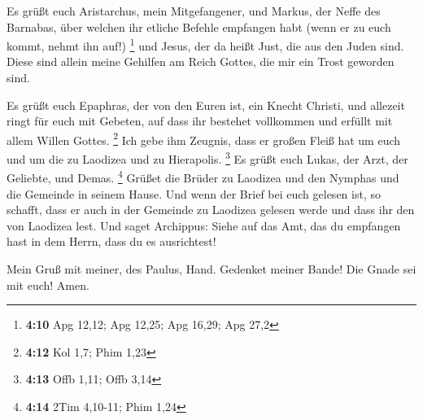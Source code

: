  Es grüßt euch Aristarchus, mein Mitgefangener, und Markus,
der Neffe des Barnabas, über welchen ihr etliche Befehle empfangen habt
(wenn er zu euch kommt, nehmt ihn auf!) \footnote{\textbf{4:10} Apg
  12,12; Apg 12,25; Apg 16,29; Apg 27,2}  und Jesus, der da
heißt Just, die aus den Juden sind. Diese sind allein meine Gehilfen am
Reich Gottes, die mir ein Trost geworden sind.

 Es grüßt euch Epaphras, der von den Euren ist, ein Knecht
Christi, und allezeit ringt für euch mit Gebeten, auf dass ihr bestehet
vollkommen und erfüllt mit allem Willen Gottes. \footnote{\textbf{4:12}
  Kol 1,7; Phim 1,23}  Ich gebe ihm Zeugnis, dass er großen
Fleiß hat um euch und um die zu Laodizea und zu Hierapolis. \footnote{\textbf{4:13}
  Offb 1,11; Offb 3,14}  Es grüßt euch Lukas, der Arzt, der
Geliebte, und Demas. \footnote{\textbf{4:14} 2Tim 4,10-11; Phim 1,24}
 Grüßet die Brüder zu Laodizea und den Nymphas und die
Gemeinde in seinem Hause.  Und wenn der Brief bei euch
gelesen ist, so schafft, dass er auch in der Gemeinde zu Laodizea
gelesen werde und dass ihr den von Laodizea lest.  Und
saget Archippus: Siehe auf das Amt, das du empfangen hast in dem Herrn,
dass du es ausrichtest!

 Mein Gruß mit meiner, des Paulus, Hand. Gedenket meiner
Bande! Die Gnade sei mit euch! Amen.

